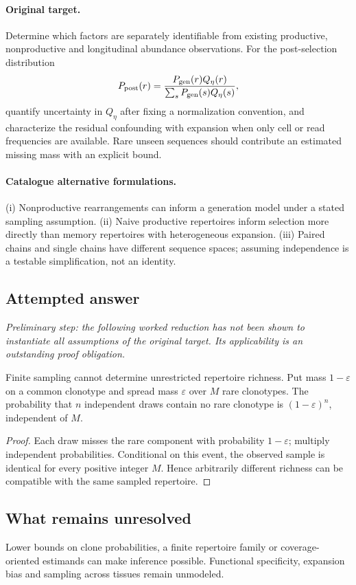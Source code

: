 \documentclass[11pt]{article}
\begin{document}
\paragraph{Original target.}
Determine which factors are separately identifiable from existing productive, nonproductive and longitudinal abundance observations. For the post-selection distribution
    \[P_{\rm post}(r)=\frac{P_{\rm gen}(r)Q_\eta(r)}{\sum_sP_{\rm gen}(s)Q_\eta(s)},\]
    quantify uncertainty in $Q_\eta$ after fixing a normalization convention, and characterize the residual confounding with expansion when only cell or read frequencies are available. Rare unseen sequences should contribute an estimated missing mass with an explicit bound.
\paragraph{Catalogue alternative formulations.}
(i) Nonproductive rearrangements can inform a generation model under a stated sampling assumption. (ii) Naive productive repertoires inform selection more directly than memory repertoires with heterogeneous expansion. (iii) Paired chains and single chains have different sequence spaces; assuming independence is a testable simplification, not an identity.
\subsection{Attempted answer}
\noindent\emph{Preliminary step: the following worked reduction has not been shown to instantiate all assumptions of the original target. Its applicability is an outstanding proof obligation.}

\begin{proposition}
Finite sampling cannot determine unrestricted repertoire richness. Put mass $1-\varepsilon$ on a common clonotype and spread mass $\varepsilon$ over $M$ rare clonotypes. The probability that $n$ independent draws contain no rare clonotype is $(1-\varepsilon)^n$, independent of $M$.
\end{proposition}
\begin{proof}
Each draw misses the rare component with probability $1-\varepsilon$; multiply independent probabilities. Conditional on this event, the observed sample is identical for every positive integer $M$. Hence arbitrarily different richness can be compatible with the same sampled repertoire.
\end{proof}
\subsection{What remains unresolved}
Lower bounds on clone probabilities, a finite repertoire family or coverage-oriented estimands can make inference possible. Functional specificity, expansion bias and sampling across tissues remain unmodeled.
\end{document}
